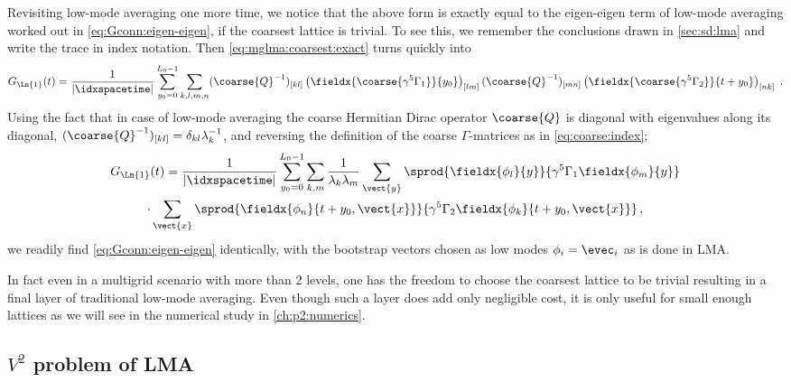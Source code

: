 Revisiting low-mode averaging one more time, we notice that the above form is exactly equal to the eigen-eigen term of low-mode averaging worked out in \cref{eq:Gconn:eigen-eigen}, if the coarsest lattice is trivial.
To see this, we remember the conclusions drawn in \cref{sec:sd:lma} and write the trace in index notation. 
Then \cref{eq:mglma:coarsest:exact} turns quickly into
\begin{equation}
G_{\Ln{1}}(t)
= \frac{1}{\lvert \idxspacetime \rvert} \sum_{y_0=0}^{L_0-1}
\sum_{k,l,m,n}
(\coarse{Q}^{-1})_{[kl]}
\left( \fieldx{\coarse{\gamma^{5} \Gamma_1}}{y_0} \right)_{[lm]}
(\coarse{Q}^{-1})_{[mn]}
\left( \fieldx{\coarse{\gamma^{5} \Gamma_2}}{t+y_0} \right)_{[nk]} \;.
\end{equation}
Using the fact that in case of low-mode averaging the coarse Hermitian Dirac operator $\coarse{Q}$ is diagonal with eigenvalues along its diagonal, $(\coarse{Q}^{-1})_{[kl]} = \delta_{kl} \lambda_k^{-1}$, and reversing the definition of the coarse $\Gamma$-matrices as in \cref{eq:coarse:index};
\begin{multline}
G_{\Ln{1}}(t)
= \frac{1}{\lvert \idxspacetime \rvert} \sum_{y_0=0}^{L_0-1} \sum_{k,m}
\frac{1}{\lambda_k \lambda_m}
\sum_{\vect{y}}
\sprod{
  \fieldx{\phi_l}{y}
}{
  \gamma^{5}
  \Gamma_1
  \fieldx{\phi_m}{y}
} \\
\cdot \sum_{\vect{x}}
\sprod{
  \fieldx{\phi_n}{t+y_0,\vect{x}}
}{
  \gamma^{5}
  \Gamma_2
  \fieldx{\phi_k}{t+y_0,\vect{x}}
} \,,
\end{multline}
we readily find \cref{eq:Gconn:eigen-eigen} identically, with the bootstrap vectors chosen as low modes $\phi_i = \evec_i$ as is done in LMA.

In fact even in a multigrid scenario with more than \num{2} levels, one has the freedom to choose the coarsest lattice to be trivial resulting in a final layer of traditional low-mode averaging.
Even though such a layer does add only negligible cost, it is only useful for small enough lattices as we will see in the numerical study in \cref{ch:p2:numerics}.

\subsection{$V^2$ problem of LMA}

